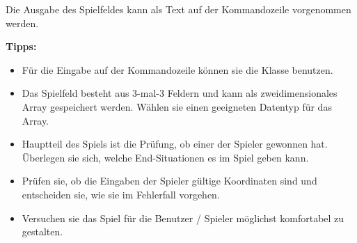 \documentclass[10pt, a4paper]{scrartcl}
\begin{document}
Die Ausgabe des Spielfeldes kann als Text auf der Kommandozeile vorgenommen werden.

\bigskip
\textbf{Tipps:}
\begin{itemize}
	\item Für die Eingabe auf der Kommandozeile können sie die Klasse \href{https://docs.oracle.com/javase/8/docs/api/java/util/Scanner.html}{} benutzen.
	\item Das Spielfeld besteht aus 3-mal-3 Feldern und kann als zweidimensionales Array gespeichert werden. Wählen sie einen geeigneten Datentyp für das Array.
	\item Hauptteil des Spiels ist die Prüfung, ob einer der Spieler gewonnen hat. Überlegen sie sich, welche End-Situationen es im Spiel geben kann.
	\item Prüfen sie, ob die Eingaben der Spieler gültige Koordinaten sind und entscheiden sie, wie sie im Fehlerfall vorgehen.
	\item Versuchen sie das Spiel für die Benutzer / Spieler möglichst komfortabel zu gestalten.
\end{itemize}
\end{document}
